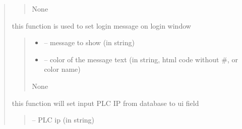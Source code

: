 \documentclass[letterpaper,10pt,english]{sphinxmanual}
\begin{document}
\begin{quote}
\begin{savenotes}
\begin{fulllineitems}
\begin{savenotes}
\begin{fulllineitems}
\begin{quote}
\begin{description}
\sphinxAtStartPar
None

\end{description}\end{quote}

\end{fulllineitems}\end{savenotes}


\begin{savenotes}\begin{fulllineitems}
\label{\detokenize{setting/setting_UI:oxin.setting_UI.UI_main_window.set_login_message}}
\pysigstartsignatures
{}
\pysigstopsignatures
\sphinxAtStartPar
this function is used to set login message on login window
\begin{quote}\begin{description}
\begin{itemize}
\item {} 
\sphinxAtStartPar
{} – message to show (in string)

\item {} 
\sphinxAtStartPar
{} – color of the message text (in string, html code without \#, or color name)

\end{itemize}

\sphinxAtStartPar
None

\end{description}\end{quote}

\end{fulllineitems}\end{savenotes}


\begin{savenotes}\begin{fulllineitems}
\label{\detokenize{setting/setting_UI:oxin.setting_UI.UI_main_window.set_plc_ip}}
\pysigstartsignatures
{}
\pysigstopsignatures
\sphinxAtStartPar
this function will set input PLC IP from database to ui field
\begin{quote}\begin{description}
\sphinxAtStartPar
{} – PLC ip (in string)


\end{description}
\end{quote}
\end{fulllineitems}
\end{savenotes}
\end{fulllineitems}
\end{savenotes}
\end{quote}
\end{document}
